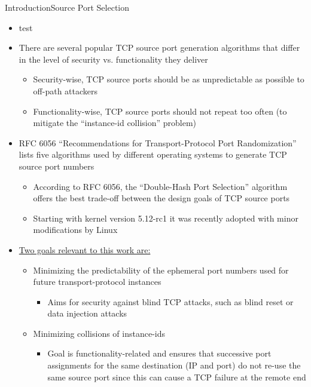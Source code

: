 \documentclass[aspectratio=169, hyperref={colorlinks=true, allcolors=SecondaryColor}, c]{beamer}
\begin{document}
\begin{frame}[fragile]{Introduction}{Source Port Selection}
	\ifbeamer
		\begin{itemize}
			\item test
		\end{itemize}
	\else
		\begin{itemize}
			\item There are several popular TCP source port generation algorithms that differ in the level of security vs. functionality they deliver
			\begin{itemize}
				\item Security-wise, TCP source ports should be as unpredictable as possible to off-path attackers
				\item Functionality-wise, TCP source ports should not repeat too often (to mitigate the \enquote{instance-id collision} problem)
			\end{itemize}
			\item RFC 6056 \enquote{Recommendations for Transport-Protocol Port Randomization} lists five algorithms used by different operating systems to generate TCP source port numbers
			\begin{itemize}
				\item According to RFC 6056, the \enquote{Double-Hash Port Selection} algorithm offers the best trade-off between the design goals of TCP source ports
				\item Starting with kernel version 5.12-rc1 it was recently adopted with minor modifications by Linux
			\end{itemize}
			\item \underline{Two goals relevant to this work are:}
			\begin{itemize}
				\item Minimizing the predictability of the ephemeral port numbers used for future transport-protocol instances
				\begin{itemize}
					\item Aims for security against blind TCP attacks, such as blind reset or data injection attacks
				\end{itemize}
				\item Minimizing collisions of instance-ids
				\begin{itemize}
					\item Goal is functionality-related and ensures that successive port assignments for the same destination (IP and port) do not re-use the same source port since this can cause a TCP failure at the remote end

\end{itemize}
\end{itemize}
\end{itemize}
\end{frame}
\end{document}
